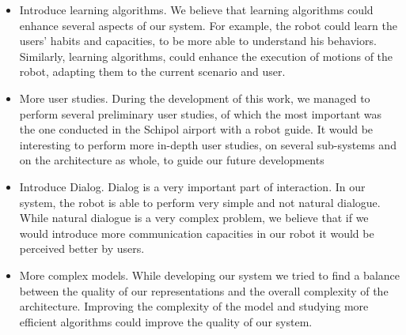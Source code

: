 \begin{itemize}
\item Introduce learning algorithms. We believe that learning algorithms could enhance several aspects of our system. For example, the robot could learn the users' habits and capacities, to be more able to understand his behaviors. Similarly, learning algorithms, could enhance the execution of motions of the robot, adapting them to the current scenario and user.
\item More user studies. During the development of this work, we managed to perform several preliminary user studies, of which the most important was the one conducted in the Schipol airport with a robot guide. It would be interesting to perform more in-depth user studies, on several sub-systems and on the architecture as whole, to guide our future developments 
\item Introduce Dialog. Dialog is a very important part of interaction. In our system, the robot is able to perform very simple and not natural dialogue. While natural dialogue is a very complex problem, we believe that if we would introduce more communication capacities in our robot it would be perceived better by users.
\item More complex models. While developing our system we tried to find a balance between the quality of our representations and the overall complexity  of the architecture. Improving the complexity of the model and studying more efficient algorithms could improve the quality of our system.
\end{itemize}
